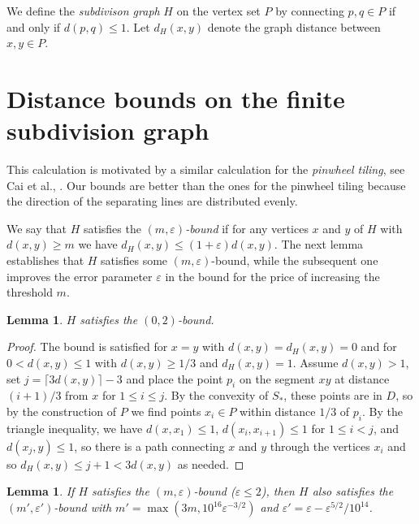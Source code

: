 \documentclass[12pt]{article}
\theoremstyle{plain}
\newtheorem{lemma}[theorem]{Lemma}
\theoremstyle{definition}
\theoremstyle{remark}
\begin{document}
We define the \emph{subdivison graph} $H$ on the vertex set $P$ by connecting $p,q\in P$ if and only if $d(p,q)\le1$. Let $d_H(x,y)$ denote the graph distance between $x,y\in P$.

\section{Distance bounds on the finite subdivision graph}\label{sec4}

This calculation is motivated by a similar calculation for the \emph{pinwheel tiling}, see Cai et al., \cite{CaC26}. Our bounds are better than the ones for the pinwheel tiling because the direction of the separating lines are distributed evenly.

We say that $H$ satisfies the \emph{$(m,\varepsilon)$-bound} if for any vertices $x$ and $y$ of $H$ with $d(x,y)\ge m$ we have $d_H(x,y)\le(1+\varepsilon)d(x,y)$. The next lemma establishes that $H$ satisfies some $(m,\varepsilon)$-bound, while the subsequent one improves the error parameter $\varepsilon$ in the bound for the price of increasing the threshold $m$.

\begin{lemma}\label{base2}
$H$ satisfies the $(0,2)$-bound.
\end{lemma}

\begin{proof}
The bound is satisfied for $x=y$ with $d(x,y)=d_H(x,y)=0$ and for $0<d(x,y)\le1$ with $d(x,y)\ge1/3$ and $d_H(x,y)=1$. Assume $d(x,y)>1$, set $j=\lceil3d(x,y)\rceil-3$ and place the point $p_i$ on the segment $xy$ at distance $(i+1)/3$ from $x$ for $1\le i\le j$. By the convexity of $S_*$, these points are in $D$, so by the construction of $P$ we find points $x_i\in P$ within distance $1/3$ of $p_i$. By the triangle inequality, we have $d(x,x_1)\le1$, $d(x_i,x_{i+1})\le1$ for $1\le i<j$, and $d(x_j,y)\le 1$, so there is a path connecting $x$ and $y$ through the vertices $x_i$ and so $d_H(x,y)\le j+1<3d(x,y)$ as needed.
\end{proof}

\begin{lemma}\label{step2}
If $H$ satisfies the $(m,\varepsilon)$-bound ($\varepsilon\le2$), then $H$ also satisfies the $(m',\varepsilon')$-bound with $m'=\max(3m,10^{16}\varepsilon^{-3/2})$ and $\varepsilon'=\varepsilon-\varepsilon^{5/2}/10^{14}$.
\end{lemma}
\end{document}
